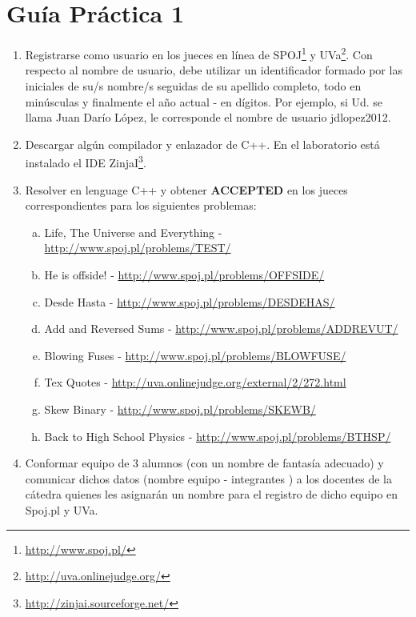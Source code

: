 




\section*{Gu\'ia Pr\'actica 1}

\begin{enumerate}[1 -]


	\item Registrarse como usuario en los jueces en línea de SPOJ\footnote{\href{http://www.spoj.pl/} {http://www.spoj.pl/}} y UVa\footnote{\href{http://uva.onlinejudge.org/} {http://uva.onlinejudge.org/}}.
Con respecto al nombre de usuario, debe utilizar un identificador formado por las iniciales de su/s nombre/s seguidas de su apellido completo, todo en minúsculas y finalmente el año actual - en dígitos. Por ejemplo, si Ud. se llama Juan Darío López, le corresponde el nombre de usuario jdlopez2012.

	\item Descargar alg\'un compilador y enlazador de C++. En el laboratorio est\'a instalado el IDE ZinjaI\footnote{\href{http://zinjai.sourceforge.net/} {http://zinjai.sourceforge.net/}}.
	
	\item Resolver en lenguage C++ y obtener \textbf{ACCEPTED} en los jueces correspondientes para los siguientes problemas:
	
	\begin{enumerate}[a)]
	
		\item Life, The Universe and Everything - \href{http://www.spoj.pl/problems/TEST/} {http://www.spoj.pl/problems/TEST/}
		\item He is offside! - \href{http://www.spoj.pl/problems/OFFSIDE/}{http://www.spoj.pl/problems/OFFSIDE/}
		\item Desde Hasta - \href{http://www.spoj.pl/problems/DESDEHAS/}{http://www.spoj.pl/problems/DESDEHAS/}
		\item Add and Reversed Sums - \href{http://www.spoj.pl/problems/ADDREVUT/}{http://www.spoj.pl/problems/ADDREVUT/} 
		\item Blowing Fuses - \href{http://www.spoj.pl/problems/BLOWFUSE/}{http://www.spoj.pl/problems/BLOWFUSE/} 
		\item Tex Quotes - \href{http://uva.onlinejudge.org/external/2/272.html}{http://uva.onlinejudge.org/external/2/272.html} 
		\item Skew Binary - \href{http://www.spoj.pl/problems/SKEWB/}{http://www.spoj.pl/problems/SKEWB/}
		\item Back to High School Physics - \href{http://www.spoj.pl/problems/BTHSP/}{http://www.spoj.pl/problems/BTHSP/} 	
	\end{enumerate}
	
	\item  Conformar equipo de 3 alumnos (con un nombre de fantasía adecuado) y comunicar dichos datos (nombre equipo - integrantes ) a los docentes de la cátedra quienes les asignarán un nombre para el registro de dicho equipo en Spoj.pl y UVa.

\end{enumerate}







